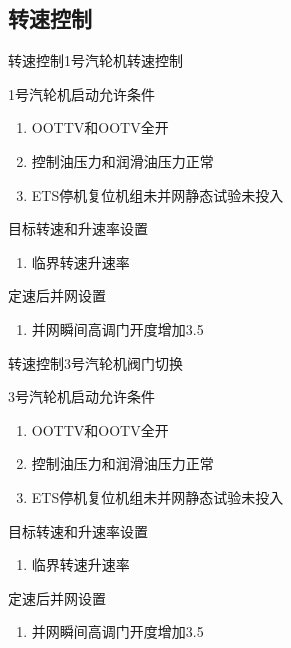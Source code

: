 \documentclass[12pt,hyperref={CJKbookmarks=true}]{beamer} %
\begin{document}
\subsection{转速控制}
\begin{frame}{转速控制}{1号汽轮机转速控制}
\begin{block}{\heiti 1号汽轮机启动允许条件}
			\begin{enumerate}
				\item OOTTV和OOTV全开
				\item 控制油压力和润滑油压力正常
				\item ETS停机复位机组未并网静态试验未投入
		\end{enumerate}
		\end{block}
\begin{block}{\heiti 目标转速和升速率设置}
			\begin{enumerate}
				\item 临界转速升速率
		\end{enumerate}
		\end{block}
\begin{block}{\heiti 定速后并网设置}
			\begin{enumerate}
				\item 并网瞬间高调门开度增加3.5
		\end{enumerate}
		\end{block}
\end{frame}
\begin{frame}{转速控制}{3号汽轮机阀门切换}
\begin{block}{\heiti 3号汽轮机启动允许条件}
			\begin{enumerate}
				\item OOTTV和OOTV全开
				\item 控制油压力和润滑油压力正常
				\item ETS停机复位机组未并网静态试验未投入
		\end{enumerate}
		\end{block}
\begin{block}{\heiti 目标转速和升速率设置}
			\begin{enumerate}
				\item 临界转速升速率
		\end{enumerate}
		\end{block}
\begin{block}{\heiti 定速后并网设置}
			\begin{enumerate}
				\item 并网瞬间高调门开度增加3.5
		\end{enumerate}
		\end{block}
\end{frame}
\end{document}
